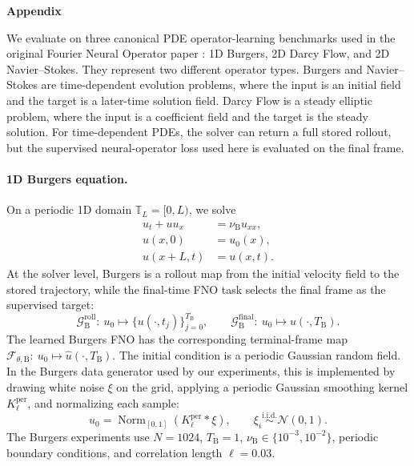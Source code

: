 \appendix
\let\footnotesize\normalsize
\renewenvironment{multicols}[1]{}{}
\renewcommand{\columnbreak}{}
\begin{center}
{\LARGE\bfseries Appendix}
\end{center}
\vspace{0.6em}
\vspace{0.4em}

We evaluate on three canonical PDE operator-learning benchmarks used in the
original Fourier Neural Operator paper \citep{li2021fourier}: 1D Burgers,
2D Darcy Flow, and 2D Navier--Stokes. They represent two different operator
types. Burgers and Navier--Stokes are time-dependent evolution problems, where
the input is an initial field and the target is a later-time solution field.
Darcy Flow is a steady elliptic problem, where the input is a coefficient field
and the target is the steady solution. For time-dependent PDEs, the solver can
return a full stored rollout, but the supervised neural-operator loss used here
is evaluated on the final frame.

\paragraph{1D Burgers equation.}
On a periodic 1D domain $\mathbb{T}_L=[0,L)$, we solve
\begin{align}
  u_t + u u_x
  &=
  \nu_{\mathrm{B}} u_{xx},
  \nonumber\\
  u(x,0)&=u_0(x),
  \nonumber\\
  u(x+L,t)&=u(x,t).
\end{align}
At the solver level, Burgers is a rollout map from the initial velocity field to
the stored trajectory, while the final-time FNO task selects the final frame as
the supervised target:
\begin{equation}
  \mathcal{G}_{\mathrm{B}}^{\mathrm{roll}}:\ u_0
  \mapsto
  \{u(\cdot,t_j)\}_{j=0}^{T_{\mathrm{B}}},
  \qquad
  \mathcal{G}_{\mathrm{B}}^{\mathrm{final}}:\ u_0
  \mapsto u(\cdot,T_{\mathrm{B}}).
\end{equation}
The learned Burgers FNO has the corresponding terminal-frame map
$\mathcal F_{\theta,\mathrm{B}}:\ u_0\mapsto
\widehat u(\cdot,T_{\mathrm{B}})$.
The initial condition is a periodic Gaussian random field. In the Burgers data
generator used by our experiments, this is implemented by drawing white noise
$\xi$ on the grid, applying a periodic Gaussian smoothing kernel
$K^{\mathrm{per}}_\ell$, and normalizing each sample:
\begin{equation}
  u_0
  =
  \operatorname{Norm}_{[0,1]}
  \!\left(K^{\mathrm{per}}_\ell * \xi\right),
  \qquad
  \xi_i\overset{\mathrm{i.i.d.}}{\sim}\mathcal{N}(0,1).
\end{equation}
The Burgers experiments use $N=1024$, $T_{\mathrm{B}}=1$,
$\nu_{\mathrm{B}}\in\{10^{-3},10^{-2}\}$, periodic boundary conditions, and
correlation length $\ell=0.03$.


